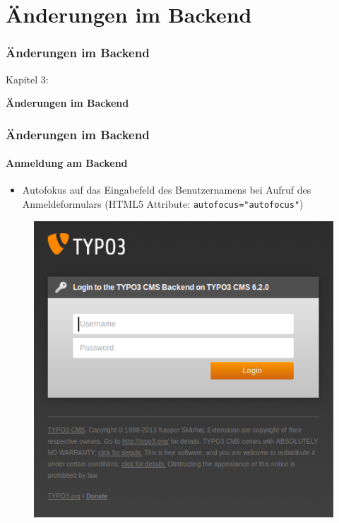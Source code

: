 %

\section{Änderungen im Backend}
\begin{frame}[fragile]
	\frametitle{Änderungen im Backend}

	\begin{center}\huge{Kapitel 3:}\end{center}
	\begin{center}\huge{\color{typo3darkgrey}\textbf{Änderungen im Backend}}\end{center}

\end{frame}


\begin{frame}[fragile]
	\frametitle{Änderungen im Backend}
	\framesubtitle{Anmeldung am Backend}

 	\begin{itemize}
		\item Autofokus auf das Eingabefeld des Benutzernamens bei Aufruf des Anmeldeformulars\newline
			\small(HTML5 Attribute: \texttt{autofocus="autofocus"})\normalsize
	\end{itemize}

	\begin{figure}
		\includegraphics[width=0.35\linewidth]{Images/BackendChanges/BackendLogin.png}
	\end{figure}

\end{frame}

